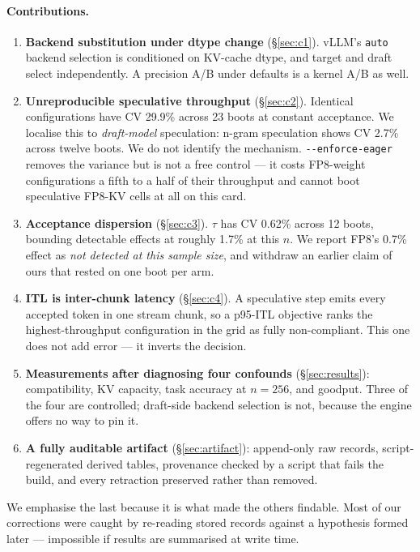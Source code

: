 \documentclass[11pt]{article}
\newcommand{\tw}[1]{\texttt{\small #1}}
\begin{document}
\paragraph{Contributions.}
\begin{enumerate}\itemsep2pt
\item \textbf{Backend substitution under dtype change} (\S\ref{sec:c1}).
vLLM's \tw{auto} backend selection is conditioned on KV-cache dtype, and
target and draft select independently. A precision A/B under defaults is a
kernel A/B as well.
\item \textbf{Unreproducible speculative throughput} (\S\ref{sec:c2}).
Identical configurations have CV 29.9\% across 23 boots at constant
acceptance. We localise this to \emph{draft-model} speculation: n-gram
speculation shows CV 2.7\% across twelve boots. We do not identify the
mechanism. \tw{-{}-enforce-eager} removes the
variance but is not a free control --- it costs FP8-weight configurations
a fifth to a half of their throughput and cannot boot speculative FP8-KV
cells at all on this card.
\item \textbf{Acceptance dispersion} (\S\ref{sec:c3}). $\tau$ has CV
0.62\% across 12 boots, bounding detectable effects at roughly 1.7\% at
this $n$. We report FP8's 0.7\% effect as \emph{not detected at this sample
size}, and withdraw an earlier claim of ours that rested on one boot per
arm.
\item \textbf{ITL is inter-chunk latency} (\S\ref{sec:c4}). A speculative
step emits every accepted token in one stream chunk, so a p95-ITL objective
ranks the highest-throughput configuration in the grid as fully
non-compliant. This one does not add error --- it inverts the decision.
\item \textbf{Measurements after diagnosing four confounds}
(\S\ref{sec:results}): compatibility, KV capacity, task accuracy at
$n{=}256$, and goodput. Three of the four are controlled; draft-side
backend selection is not, because the engine offers no way to pin it.
\item \textbf{A fully auditable artifact} (\S\ref{sec:artifact}):
append-only raw records, script-regenerated derived tables, provenance
checked by a script that fails the build, and every retraction preserved
rather than removed.
\end{enumerate}

We emphasise the last because it is what made the others findable. Most of
our corrections were caught by re-reading stored records against a
hypothesis formed later --- impossible if results are summarised at write
time.
\end{document}
